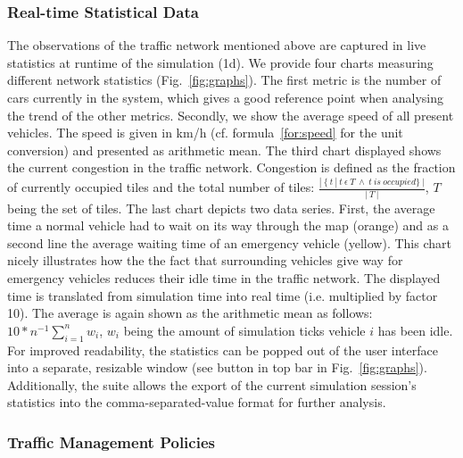 \subsubsection*{Real-time Statistical Data}

The observations of the traffic network mentioned above are captured in live statistics at runtime of the simulation (1d).  We provide four charts measuring different network statistics (Fig.~\ref{fig:graphs}). The first metric is the number of cars currently in the system, which gives a good reference point when analysing the trend of the other metrics. Secondly, we show the average speed of all present vehicles. The speed is given in km/h (cf. formula~\ref{for:speed} for the unit conversion) and presented as arithmetic mean. The third chart displayed shows the current congestion in the traffic network. Congestion is defined as the fraction of currently occupied tiles and the total number of tiles: $\frac{|\:\lbrace \:t\:|\:t\:\epsilon\:T\:\wedge\:t\:is\:occupied\rbrace\:|}{|\:T\:|}$, $T$ being the set of tiles. The last chart depicts two data series. First, the average time a normal vehicle had to wait on its way through the map (orange) and as a second line the average waiting time of an emergency vehicle (yellow). This chart nicely illustrates how the the fact that surrounding vehicles give way for emergency vehicles reduces their idle time in the traffic network. The displayed time is translated from simulation time into real time (i.e. multiplied by factor 10). The average is again shown as the arithmetic mean as follows: $10*n^{-1}\sum\limits_{i=1}^n w_i$, $w_i$ being the amount of simulation ticks vehicle $i$ has been idle. For improved readability, the statistics can be popped out of the user interface into a separate, resizable window (see button in top bar in Fig.~\ref{fig:graphs}). Additionally, the suite allows the export of the current simulation session's statistics into the comma-separated-value format for further analysis.

\subsubsection*{Traffic Management Policies}

